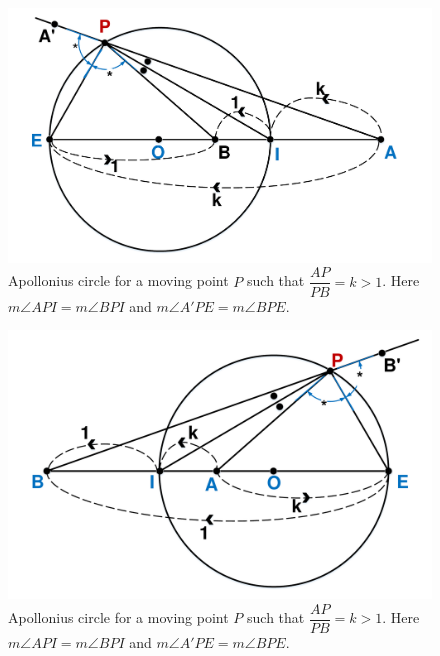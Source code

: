 \documentclass{beamer}
\begin{document}
\begin{frame}
\begin{figure}[htb]
\centering
\includegraphics[scale = 0.3]{fig/drawing1.pdf}
\caption{Apollonius circle for a moving point $P$ such that $\dfrac{AP}{PB}=k>1$. Here $m\angle API = m\angle BPI$ and $m\angle A'PE = m\angle BPE$.}
\label{1}
\end{figure}
\end{frame}
\begin{frame}
\begin{figure}[htb]
\centering
\includegraphics[scale = 0.3]{fig/drawing2.pdf}
\caption{Apollonius circle for a moving point $P$ such that $\dfrac{AP}{PB}=k>1$. Here $m\angle API = m\angle BPI$ and $m\angle A'PE = m\angle BPE$.}
\label{1}
\end{figure}
\end{frame}
\end{document}
